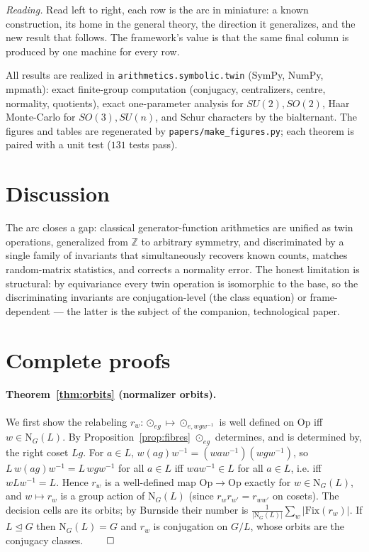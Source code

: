 \documentclass[11pt,a4paper]{article}
\newcommand{\Op}{\mathrm{Op}}
\newcommand{\Z}{\mathbb{Z}}
\newcommand{\Norm}{\mathrm{N}}
\newcommand{\code}[1]{\texttt{#1}}
\theoremstyle{plain}
\theoremstyle{definition}
\theoremstyle{remark}
\begin{document}
\noindent\emph{Reading.} Read left to right, each row is the arc in miniature: a
known construction, its home in the general theory, the direction it
generalizes, and the new result that follows. The framework's value is that the
same final column is produced by one machine for every row.

All results are realized in \code{arithmetics.symbolic.twin} (SymPy, NumPy,
mpmath): exact finite-group computation (conjugacy, centralizers, centre,
normality, quotients), exact one-parameter analysis for $SU(2),SO(2)$, Haar
Monte-Carlo for $SO(3),SU(n)$, and Schur characters by the bialternant. The
figures and tables are regenerated by \code{papers/make\_figures.py}; each
theorem is paired with a unit test ($131$ tests pass).

\section{Discussion}

The arc closes a gap: classical generator-function arithmetics are unified as
twin operations, generalized from $\Z$ to arbitrary symmetry, and discriminated
by a single family of invariants that simultaneously recovers known counts,
matches random-matrix statistics, and corrects a normality error. The honest
limitation is structural: by equivariance every twin operation is isomorphic to
the base, so the discriminating invariants are conjugation-level (the class
equation) or frame-dependent --- the latter is the subject of the companion,
technological paper.

\appendix

\section{Complete proofs}
\label{app:proofs}

\paragraph{Theorem~\ref{thm:orbits} (normalizer orbits).}
We first show the relabeling $r_w:\odot_{eg}\mapsto\odot_{e,wgw^{-1}}$ is
well defined on $\Op$ iff $w\in\Norm_G(L)$. By Proposition~\ref{prop:fibres}
$\odot_{eg}$ determines, and is determined by, the right coset $Lg$. For $a\in L$,
$w(ag)w^{-1}=(waw^{-1})(wgw^{-1})$, so $L\,w(ag)w^{-1}=L\,wgw^{-1}$ for all $a\in
L$ iff $waw^{-1}\in L$ for all $a\in L$, i.e. iff $wLw^{-1}=L$. Hence $r_w$ is a
well-defined map $\Op\to\Op$ exactly for $w\in\Norm_G(L)$, and
$w\mapsto r_w$ is a group action of $\Norm_G(L)$ (since $r_w r_{w'}=r_{ww'}$ on
cosets). The decision cells are its orbits; by Burnside their number is
$\frac{1}{|\Norm_G(L)|}\sum_{w}|\mathrm{Fix}(r_w)|$. If $L\trianglelefteq G$ then
$\Norm_G(L)=G$ and $r_w$ is conjugation on $G/L$, whose orbits are the conjugacy
classes. $\qed$
\end{document}
